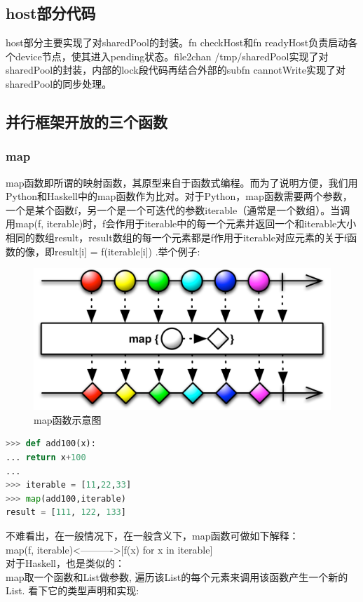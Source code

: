 \documentclass[paper=a4]{ctexart} %
\numberwithin{equation}{section} %
\numberwithin{figure}{section} %
\numberwithin{table}{section} %
\newcommand{\n}{\\\indent}
\begin{document}
\subsection{host部分代码}
host部分主要实现了对sharedPool的封装。fn checkHost和fn readyHost负责启动各个device节点，使其进入pending状态。file2chan /tmp/sharedPool实现了对sharedPool的封装，内部的lock段代码再结合外部的subfn cannotWrite实现了对sharedPool的同步处理。

\subsection{并行框架开放的三个函数}

\subsubsection{map}
map函数即所谓的映射函数，其原型来自于函数式编程。而为了说明方便，我们用Python和Haskell中的map函数作为比对。对于Python，map函数需要两个参数，一个是某个函数f，另一个是一个可迭代的参数iterable（通常是一个数组）。当调用map(f, iterable)时，f会作用于iterable中的每一个元素并返回一个和iterable大小相同的数组result，result数组的每一个元素都是f作用于iterable对应元素的关于f函数的像，即result[i] = f(iterable[i]) .举个例子:

\begin{figure}[htbp]
\centering
\includegraphics[width=\textwidth]{pic/map.png}
\caption{map函数示意图}
\end{figure}


\begin{lstlisting}[language=python]
>>> def add100(x):
... return x+100
... 
>>> iterable = [11,22,33]
>>> map(add100,iterable)
result = [111, 122, 133]
\end{lstlisting}
不难看出，在一般情况下，在一般含义下，map函数可做如下解释：\n
map(f, iterable)<———->[f(x) for x in iterable] \n
对于Haskell，也是类似的： \n
map取一个函数和List做参数, 遍历该List的每个元素来调用该函数产生一个新的List. 看下它的类型声明和实现: \n
\end{document}
